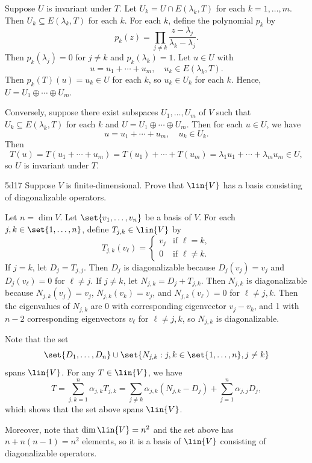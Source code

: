 \begin{sol}
    Suppose $U$ is invariant under $T$.
    Let $U_k = U \cap E(\lambda_k, T)$ for each $k = 1, \ldots, m$.
    Then $U_k \subseteq E(\lambda_k, T)$ for each $k$.
    For each $k$, define the polynomial $p_k$ by
    \[
        p_k(z) = \prod_{j \neq k} \frac{z - \lambda_j}{\lambda_k - \lambda_j}.
    \]
    Then $p_k(\lambda_j) = 0$ for $j \neq k$ and $p_k(\lambda_k) = 1$.
    Let $u \in U$ with
    \[
        u = u_1 + \cdots + u_m, \quad u_k \in E(\lambda_k, T).
    \]
    Then $p_k(T)(u) = u_k \in U$ for each $k$, so $u_k \in U_k$ for each $k$.
    Hence, $U = U_1 \oplus \cdots \oplus U_m$.

    Conversely, suppose there exist subspaces $U_1, \ldots, U_m$ of $V$ such that $U_k \subseteq E(\lambda_k, T)$ for each $k$ and $U = U_1 \oplus \cdots \oplus U_m$.
    Then for each $u \in U$, we have
    \[
        u = u_1 + \cdots + u_m, \quad u_k \in U_k.
    \]
    Then
    \[
        T(u) = T(u_1 + \cdots + u_m) = T(u_1) + \cdots + T(u_m) = \lambda_1 u_1 + \cdots + \lambda_m u_m \in U,
    \]
    so $U$ is invariant under $T$.
\end{sol}

\begin{exercise}{5d17}
    Suppose $V$ is finite-dimensional.
    Prove that $\lin{V}$ has a basis consisting of diagonalizable operators.
\end{exercise}

\begin{sol}
    Let $n = \dim V$.
    Let $\set{v_1, \ldots, v_n}$ be a basis of $V$.
    For each $j, k \in \set{1, \ldots, n}$, define $T_{j, k} \in \lin{V}$ by
    \[
        T_{j, k}(v_\ell) = 
        \begin{cases}
            v_j & \text{if } \ell = k, \\
            0 & \text{if } \ell \neq k.
        \end{cases}
    \]
    If $j = k$, let $D_j = T_{j, j}$.
    Then $D_j$ is diagonalizable because $D_j(v_j) = v_j$ and $D_j(v_\ell) = 0$ for $\ell \neq j$.
    If $j \neq k$, let $N_{j, k} = D_j + T_{j, k}$.
    Then $N_{j, k}$ is diagonalizable because $N_{j, k}(v_j) = v_j$, $N_{j, k}(v_k) = v_j$, and $N_{j, k}(v_\ell) = 0$ for $\ell \neq j, k$.
    Then the eigenvalues of $N_{j, k}$ are 0 with corresponding eigenvector $v_j - v_k$, and 1 with $n - 2$ corresponding eigenvectors $v_\ell$ for $\ell \neq j, k$, so $N_{j, k}$ is diagonalizable.

    Note that the set
    \[
        \set{D_1, \ldots, D_n} \cup \set{N_{j, k} : j, k \in \set{1, \ldots, n}, j \neq k}
    \]
    spans $\lin{V}$.
    For any $T \in \lin{V}$, we have
    \[
        T = \sum_{j,k = 1}^n \alpha_{j, k} T_{j, k} = \sum_{j \neq k} \alpha_{j, k} (N_{j, k} - D_j) + \sum_{j = 1}^n \alpha_{j, j} D_j,
    \]
    which shows that the set above spans $\lin{V}$.

    Moreover, note that $\dim \lin{V} = n^2$ and the set above has $n + n(n - 1) = n^2$ elements, so it is a basis of $\lin{V}$ consisting of diagonalizable operators.
\end{sol}

